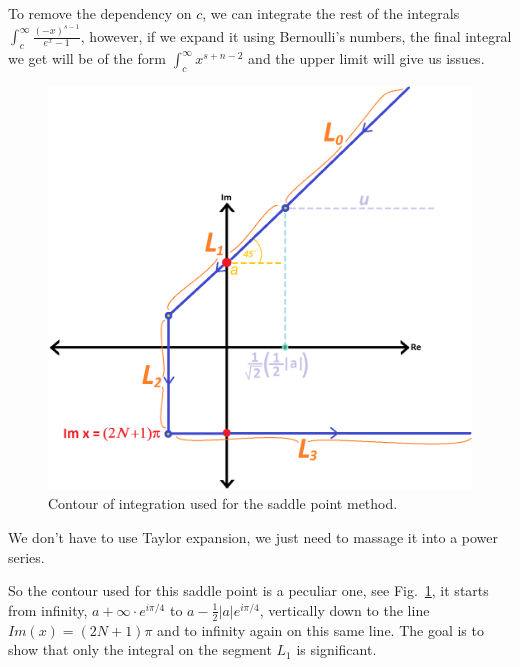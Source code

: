 \documentclass[aps,preprint,preprintnumbers,nofootinbib,showpacs,prd]{revtex4-1}
\begin{document}
To remove the dependency on $c$, we can integrate the rest of the integrals $\int_c^\infty \frac{(-x)^{s-1}}{e^x - 1}$, however, if we expand it using Bernoulli's numbers, the final integral we get will be of the form $\int_c^\infty x^{s + n -2}$ and the upper limit will give us issues.






%
\begin{figure}
\centering
  \includegraphics[width=1.00\linewidth]{Saddle_Point_Contour.png}
  \caption{Contour of integration used for the saddle point method.}
\label{fig:Saddle_Point_Contour}
\end{figure}
%





We don't have to use Taylor expansion, we just need to massage it into a power series.













So the contour used for this saddle point is a peculiar one, see Fig.~\ref{fig:Saddle_Point_Contour}, it starts from infinity, $a + \infty\cdot e^{i\pi/4}$ to $a - \frac{1}{2}|a|e^{i\pi/4}$, vertically down to the line $Im(x) = (2N+1)\pi$ and to infinity again on this same line. The goal is to show that only the integral on the segment $L_1$ is significant.
\end{document}

